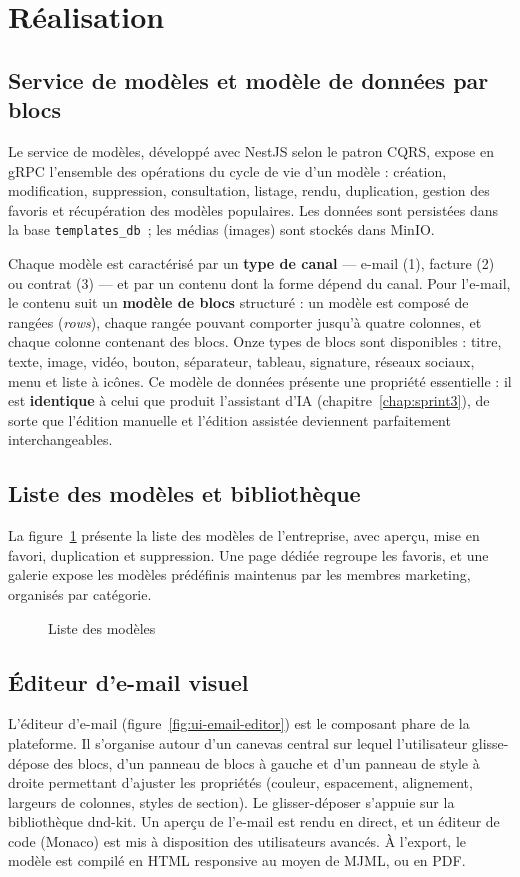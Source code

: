 \documentclass[12pt,a4paper,oneside]{report}
\newcommand{\figplaceholder}[3]{%
  \begin{figure}[H]
    \centering
    \fbox{\parbox[c][#3][c]{0.7\linewidth}{\centering\itshape%
      [\,EMPLACEMENT FIGURE\,]\\ #1}}
    \caption{#1}
    \label{#2}
  \end{figure}%
}
\begin{document}
\section{Réalisation}

\subsection{Service de modèles et modèle de données par blocs}
Le service de modèles, développé avec NestJS selon le patron CQRS, expose en
gRPC l'ensemble des opérations du cycle de vie d'un modèle : création,
modification, suppression, consultation, listage, rendu, duplication,
gestion des favoris et récupération des modèles populaires. Les données sont
persistées dans la base \texttt{templates\_db}~; les médias (images) sont
stockés dans MinIO.

Chaque modèle est caractérisé par un \textbf{type de canal} — e-mail (1),
facture (2) ou contrat (3) — et par un contenu dont la
forme dépend du canal. Pour l'e-mail, le contenu suit un
\textbf{modèle de blocs} structuré : un modèle est composé de rangées
(\emph{rows}), chaque rangée pouvant comporter jusqu'à quatre colonnes, et
chaque colonne contenant des blocs. Onze types de blocs sont disponibles :
titre, texte, image, vidéo, bouton, séparateur, tableau, signature, réseaux
sociaux, menu et liste à icônes. Ce modèle de données présente une propriété
essentielle : il est \textbf{identique} à celui que produit l'assistant
d'IA (chapitre~\ref{chap:sprint3}), de sorte que l'édition manuelle et
l'édition assistée deviennent parfaitement interchangeables.

\subsection{Liste des modèles et bibliothèque}
La figure~\ref{fig:ui-templates-list} présente la liste des modèles de
l'entreprise, avec aperçu, mise en favori, duplication et suppression. Une
page dédiée regroupe les favoris, et une galerie expose les modèles
prédéfinis maintenus par les membres marketing, organisés par catégorie.

\figplaceholder{Liste des modèles}{fig:ui-templates-list}{6cm}

\subsection{Éditeur d'e-mail visuel}
L'éditeur d'e-mail (figure~\ref{fig:ui-email-editor}) est le composant phare
de la plateforme. Il s'organise autour d'un canevas central sur lequel
l'utilisateur glisse-dépose des blocs, d'un panneau de blocs à gauche et
d'un panneau de style à droite permettant d'ajuster les propriétés (couleur,
espacement, alignement, largeurs de colonnes, styles de section). Le
glisser-déposer s'appuie sur la bibliothèque dnd-kit. Un aperçu de l'e-mail
est rendu en direct, et un éditeur de code (Monaco) est mis à disposition
des utilisateurs avancés. À l'export, le modèle est compilé en HTML
responsive au moyen de MJML, ou en PDF.
\end{document}
